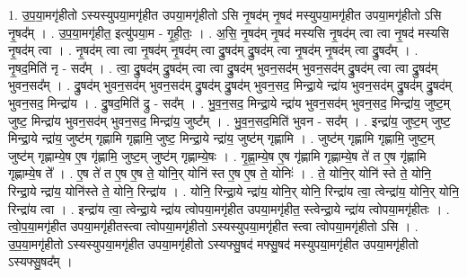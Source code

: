 \documentclass[17pt]{extarticle}
\begin{document}
1. उ॒प॒या॒मगृ॑हीतो ऽस्यस्युपया॒मगृ॑हीत उपया॒मगृ॑हीतो ऽसि नृ॒षद॑म् नृ॒षद॑ मस्युपया॒मगृ॑हीत उपया॒मगृ॑हीतो ऽसि नृ॒षद᳚म् । . उ॒प॒या॒मगृ॑हीत॒ इत्यु॑पया॒म - गृ॒ही॒तः॒ । . अ॒सि॒ नृ॒षद॑म् नृ॒षद॑ मस्यसि नृ॒षद॑म् त्वा त्वा नृ॒षद॑ मस्यसि नृ॒षद॑म् त्वा । . नृ॒षद॑म् त्वा त्वा नृ॒षद॑म् नृ॒षद॑म् त्वा द्रु॒षद॑म् द्रु॒षद॑म् त्वा नृ॒षद॑म् नृ॒षद॑म् त्वा द्रु॒षद᳚म् । . नृ॒षद॒मिति॑ नृ - सद᳚म् । . त्वा॒ द्रु॒षद॑म् द्रु॒षद॑म् त्वा त्वा द्रु॒षद॑म् भुवन॒सद॑म् भुवन॒सद॑म् द्रु॒षद॑म् त्वा त्वा द्रु॒षद॑म् भुवन॒सद᳚म् । . द्रु॒षद॑म् भुवन॒सद॑म् भुवन॒सद॑म् द्रु॒षद॑म् द्रु॒षद॑म् भुवन॒सद॒ मिन्द्रा॒ये न्द्रा॑य भुवन॒सद॑म् द्रु॒षद॑म् द्रु॒षद॑म् भुवन॒सद॒ मिन्द्रा॑य । . द्रु॒षद॒मिति॑ द्रु - सद᳚म् । . भु॒व॒न॒सद॒ मिन्द्रा॒ये न्द्रा॑य भुवन॒सद॑म् भुवन॒सद॒ मिन्द्रा॑य॒ जुष्ट॒म् जुष्ट॒ मिन्द्रा॑य भुवन॒सद॑म् भुवन॒सद॒ मिन्द्रा॑य॒ जुष्ट᳚म् । . भु॒व॒न॒सद॒मिति॑ भुवन - सद᳚म् । . इन्द्रा॑य॒ जुष्ट॒म् जुष्ट॒ मिन्द्रा॒ये न्द्रा॑य॒ जुष्ट॑म् गृह्णामि गृह्णामि॒ जुष्ट॒ मिन्द्रा॒ये न्द्रा॑य॒ जुष्ट॑म् गृह्णामि । . जुष्ट॑म् गृह्णामि गृह्णामि॒ जुष्ट॒म् जुष्ट॑म् गृह्णाम्ये॒ष ए॒ष गृ॑ह्णामि॒ जुष्ट॒म् जुष्ट॑म् गृह्णाम्ये॒षः । . गृ॒ह्णा॒म्ये॒ष ए॒ष गृ॑ह्णामि गृह्णाम्ये॒ष ते॑ त ए॒ष गृ॑ह्णामि गृह्णाम्ये॒ष ते᳚ । . ए॒ष ते॑ त ए॒ष ए॒ष ते॒ योनि॒र् योनि॑ स्त ए॒ष ए॒ष ते॒ योनिः॑ । . ते॒ योनि॒र् योनि॑ स्ते ते॒ योनि॒ रिन्द्रा॒ये न्द्रा॑य॒ योनि॑स्ते ते॒ योनि॒ रिन्द्रा॑य । . योनि॒ रिन्द्रा॒ये न्द्रा॑य॒ योनि॒र् योनि॒ रिन्द्रा॑य त्वा॒ त्वेन्द्रा॑य॒ योनि॒र् योनि॒ रिन्द्रा॑य त्वा । . इन्द्रा॑य त्वा॒ त्वेन्द्रा॒ये न्द्रा॑य त्वोपया॒मगृ॑हीत उपया॒मगृ॑हीत॒ स्त्वेन्द्रा॒ये न्द्रा॑य त्वोपया॒मगृ॑हीतः । . त्वो॒प॒या॒मगृ॑हीत उपया॒मगृ॑हीतस्त्वा त्वोपया॒मगृ॑हीतो ऽस्यस्युपया॒मगृ॑हीत स्त्वा त्वोपया॒मगृ॑हीतो ऽसि । . उ॒प॒या॒मगृ॑हीतो ऽस्यस्युपया॒मगृ॑हीत उपया॒मगृ॑हीतो ऽस्यफ्सु॒षद॑ मफ्सु॒षद॑ मस्युपया॒मगृ॑हीत उपया॒मगृ॑हीतो ऽस्यफ्सु॒षद᳚म् । \newline
\end{document}
